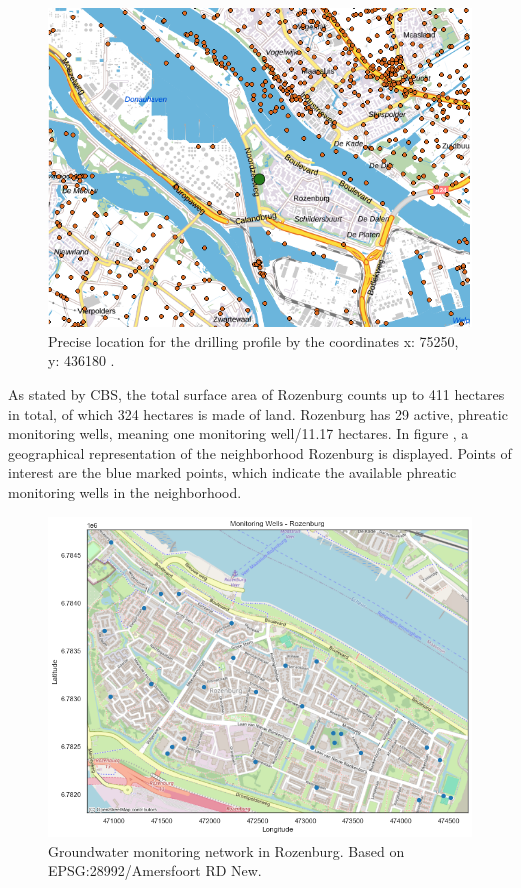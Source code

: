 \begin{figure}[htbp]
    \centering
    \includegraphics[width=0.60\linewidth]{figures/roz/boor.png}
    \caption{Precise location for the drilling profile by the coordinates x: 75250, y: 436180 \cite{tno-geologische-dienst-nederland-2023}.}
    \label{drillroz}
\end{figure}
\newpage
\noindent
As stated by CBS, the total surface area of Rozenburg counts up to 411 hectares in total, of which 324 hectares is made of land. Rozenburg has 29 active, phreatic monitoring wells, meaning one monitoring well/11.17 hectares. In figure , a geographical representation of the neighborhood Rozenburg is displayed. Points of interest are the blue marked points, which indicate the available phreatic monitoring wells in the neighborhood.
\begin{figure}[htbp]
    \centering
    \includegraphics[width=0.70\linewidth]{frontmatter/Rozenburg-fig/Before.png}
    \caption{Groundwater monitoring network in Rozenburg. Based on EPSG:28992/Amersfoort RD New.}\label{beforeroz}
\end{figure}
\newpage
